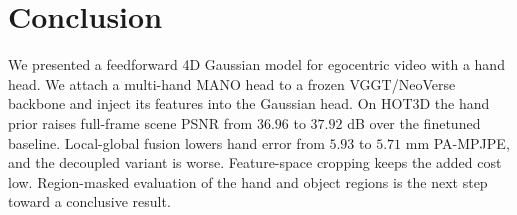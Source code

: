 \documentclass[10pt,twocolumn,letterpaper]{article}
\begin{document}
\section{Conclusion}
\label{sec:conclusion}
We presented a feedforward 4D Gaussian model for egocentric video with a hand
head. We attach a multi-hand MANO head to a frozen VGGT/NeoVerse backbone and
inject its features into the Gaussian head. On HOT3D the hand prior raises
full-frame scene PSNR from $36.96$ to $37.92$ dB over the finetuned baseline.
Local-global fusion lowers hand error from $5.93$ to $5.71$ mm PA-MPJPE, and the
decoupled variant is worse. Feature-space cropping keeps the added cost low.
Region-masked evaluation of the hand and object regions is the next step toward a
conclusive result.

{
    \small
    
    
}
\end{document}
